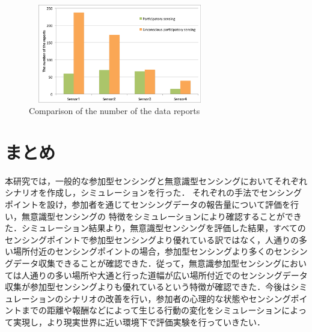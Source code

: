 \documentclass[submit,techrep]{ipsj}
\begin{document}

\begin{figure}[t]
 \begin{center}
  \includegraphics[keepaspectratio, width=80mm,height=43mm]{Result.eps}
 \end{center}
 \caption{Comparison of the number of the data reports}
 \label{Result}
\end{figure}

\section{まとめ}
本研究では，一般的な参加型センシングと無意識型センシングにおいてそれぞれシナリオを作成し，シミュレーションを行った．
それぞれの手法でセンシングポイントを設け，参加者を通じてセンシングデータの報告量について評価を行い，無意識型センシングの
特徴をシミュレーションにより確認することができた．シミュレーション結果より，無意識型センシングを評価した結果，すべてのセンシングポイントで参加型センシングより優れている訳ではなく，人通りの多い場所付近のセンシングポイントの場合，参加型センシングより多くのセンシングデータ収集できることが確認できた．従って，無意識参加型センシングにおいては人通りの多い場所や大通と行った道幅が広い場所付近でのセンシングデータ収集が参加型センシングよりも優れているという特徴が確認できた．今後はシミュレーションのシナリオの改善を行い，参加者の心理的な状態やセンシングポイントまでの距離や報酬などによって生じる行動の変化をシミュレーションによって実現し，より現実世界に近い環境下で評価実験を行っていきたい．
\end{document}
